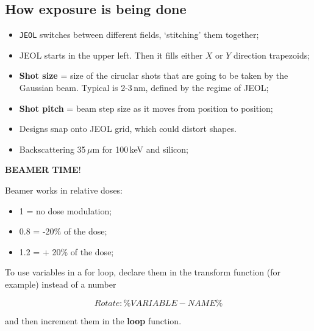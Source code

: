 \subsection{How exposure is being done}
\begin{itemize}
\item \verb|JEOL| switches between different fields, `stitching' them together;
\item  JEOL starts  in the  upper  left.  Then  it  fills either  $ X  $  or $  Y $  direction
  trapezoids;
\item \textbf{Shot  size} =  size of  the ciruclar  shots that are  going to  be taken  by the
  Gaussian beam.  Typical is 2-3\,nm, defined by the regime of JEOL;
\item  \textbf{Shot  pitch}  =  beam  step  size  as  it  moves  from  position  to  position;
\item Designs snap onto JEOL grid, which could distort shapes.
\item Backscattering 35\,$ \mu $m for 100\,keV and silicon;
\end{itemize}
\newpage
\begin{center}
  {\Huge \textbf{BEAMER TIME}!}
\end{center}
\begin{framed}\noindent
  Beamer works in relative doses:
  \begin{itemize}
  \item 1 = no dose modulation;
  \item 0.8 = -20\% of the dose;
  \item 1.2 = + 20\% of the dose;
  \end{itemize}
    

  To use variables in a for loop, declare them in the transform function (for example) instead
  of a number

  \begin{equation}
    \label{eq:variable}
    Rotate:    \%VARIABLE-NAME\%
  \end{equation}

  \noindent and then increment them in the \textbf{loop} function.
\end{framed}

